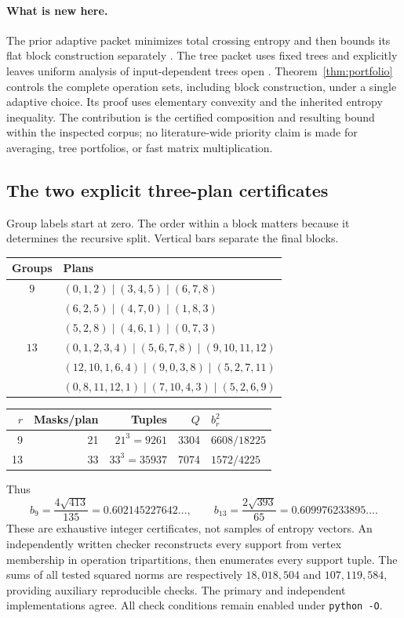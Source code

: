 \documentclass[11pt]{article}
\theoremstyle{remark}\newtheorem{remark}[theorem]{Remark}
\begin{document}
\paragraph{What is new here.}
The prior adaptive packet minimizes total crossing entropy and then bounds
its flat block construction separately \cite{adaptive}. The tree packet
uses fixed trees and explicitly leaves uniform analysis of input-dependent
trees open \cite{tree}. Theorem~\ref{thm:portfolio} controls the complete
operation sets, including block construction, under a single adaptive choice.
Its proof uses elementary convexity and the inherited entropy inequality.
The contribution is the certified composition and resulting bound within
the inspected corpus; no literature-wide priority claim is made for
averaging, tree portfolios, or fast matrix multiplication.

\subsection{The two explicit three-plan certificates}
\label{sec:certificates}
Group labels start at zero. The order within a block matters because it
determines the recursive split. Vertical bars separate the final blocks.
\begin{center}\small
\begin{tabular}{cl}
\toprule Groups & Plans\\\midrule
$9$ & $(0,1,2)\mid(3,4,5)\mid(6,7,8)$\\
 & $(6,2,5)\mid(4,7,0)\mid(1,8,3)$\\
 & $(5,2,8)\mid(4,6,1)\mid(0,7,3)$\\[4pt]
$13$ & $(0,1,2,3,4)\mid(5,6,7,8)\mid(9,10,11,12)$\\
 & $(12,10,1,6,4)\mid(9,0,3,8)\mid(5,2,7,11)$\\
 & $(0,8,11,12,1)\mid(7,10,4,3)\mid(5,2,6,9)$\\
\bottomrule
\end{tabular}\end{center}

\begin{center}
\begin{tabular}{rrrrl}
\toprule
$r$ & Masks/plan & Tuples & $Q$ & $b_r^2$\\\midrule
9 &21 &$21^3=9261$ &3304 &$6608/18225$\\
13 &33 &$33^3=35937$ &7074 &$1572/4225$\\
\bottomrule
\end{tabular}
\end{center}
Thus
\[
 b_9=\frac{4\sqrt{413}}{135}=0.602145227642\ldots,
 \qquad b_{13}=\frac{2\sqrt{393}}{65}=0.609976233895\ldots.
\]
These are exhaustive integer certificates, not samples of entropy vectors.
An independently written checker reconstructs every support from vertex
membership in operation tripartitions, then enumerates every support tuple.
The sums of all tested squared norms are respectively $18{,}018{,}504$ and
$107{,}119{,}584$, providing auxiliary reproducible checks. The primary and
independent implementations agree. All check conditions remain enabled under
\texttt{python -O}.
\end{document}

